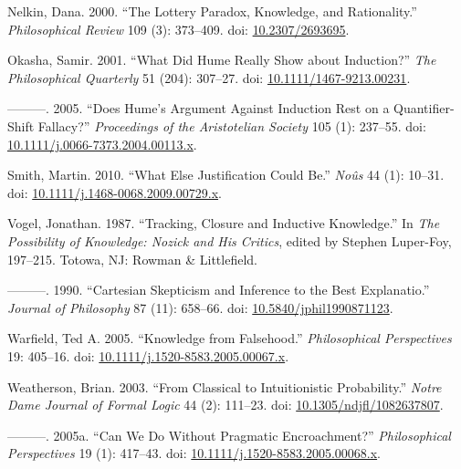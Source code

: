 \documentclass[
  11pt,
  letterpaper,
  DIV=11,
  numbers=noendperiod,
  twoside]{scrartcl}
\newlength{\cslhangindent}
\newenvironment{CSLReferences}[2] %
 {\begin{list}{}{%
  \setlength{\itemindent}{0pt}
  \setlength{\leftmargin}{0pt}
  \setlength{\parsep}{0pt}
  \ifodd #1
   \setlength{\leftmargin}{\cslhangindent}
   \setlength{\itemindent}{-1\cslhangindent}
  \fi
  \setlength{\itemsep}{#2\baselineskip}}}
 {\end{list}}
\begin{document}
\begin{CSLReferences}{1}{0}
Nelkin, Dana. 2000. {``The Lottery Paradox, Knowledge, and
Rationality.''} \emph{Philosophical Review} 109 (3): 373--409. doi:
\href{https://doi.org/10.2307/2693695}{10.2307/2693695}.

Okasha, Samir. 2001. {``What Did Hume Really Show about Induction?''}
\emph{The Philosophical Quarterly} 51 (204): 307--27. doi:
\href{https://doi.org/10.1111/1467-9213.00231}{10.1111/1467-9213.00231}.

---------. 2005. {``Does Hume's Argument Against Induction Rest on a
Quantifier-Shift Fallacy?''} \emph{Proceedings of the Aristotelian
Society} 105 (1): 237--55. doi:
\href{https://doi.org/10.1111/j.0066-7373.2004.00113.x}{10.1111/j.0066-7373.2004.00113.x}.

Smith, Martin. 2010. {``What Else Justification Could Be.''}
\emph{No{û}s} 44 (1): 10--31. doi:
\href{https://doi.org/10.1111/j.1468-0068.2009.00729.x}{10.1111/j.1468-0068.2009.00729.x}.

Vogel, Jonathan. 1987. {``Tracking, Closure and Inductive Knowledge.''}
In \emph{The Possibility of Knowledge: Nozick and His Critics}, edited
by Stephen Luper-Foy, 197--215. Totowa, NJ: Rowman \& Littlefield.

---------. 1990. {``Cartesian Skepticism and Inference to the Best
Explanatio.''} \emph{Journal of Philosophy} 87 (11): 658--66. doi:
\href{https://doi.org/10.5840/jphil1990871123}{10.5840/jphil1990871123}.

Warfield, Ted A. 2005. {``Knowledge from Falsehood.''}
\emph{Philosophical Perspectives} 19: 405--16. doi:
\href{https://doi.org/10.1111/j.1520-8583.2005.00067.x}{10.1111/j.1520-8583.2005.00067.x}.

Weatherson, Brian. 2003. {``From Classical to Intuitionistic
Probability.''} \emph{Notre Dame Journal of Formal Logic} 44 (2):
111--23. doi:
\href{https://doi.org/10.1305/ndjfl/1082637807}{10.1305/ndjfl/1082637807}.

---------. 2005a. {``{Can We Do Without Pragmatic Encroachment?}''}
\emph{Philosophical Perspectives} 19 (1): 417--43. doi:
\href{https://doi.org/10.1111/j.1520-8583.2005.00068.x}{10.1111/j.1520-8583.2005.00068.x}.


\end{CSLReferences}
\end{document}
